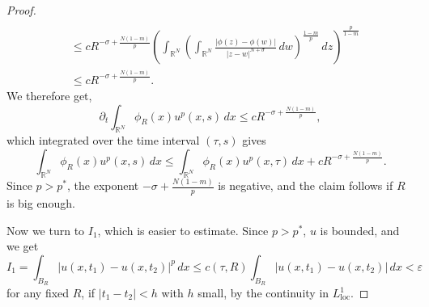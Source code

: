 \documentclass[10pt,a4paper]{amsart}
\begin{document}
\begin{proof}
\begin{align*}
 \\&
\le  cR^{-\sigma+\frac{N(1-m)}{p}}\left(\int_{\mathbb{R}^N}\left( \int_{\mathbb{R}^N}\frac{|\phi(z)-\phi(w)|}{|z-w|^{N+\sigma}}\,dw\right)^{\frac{1-m}{p}}\,dz\right)^{\frac p{1-m}}
 \\&
\le  cR^{-\sigma+\frac{N(1-m)}{p}}.
\end{align*}
We therefore get,
$$
\partial_t\int_{\mathbb{R}^N}\phi_R(x)u^p(x,s)\,dx\le cR^{-\sigma+\frac{N(1-m)}{p}},
$$
which integrated over the time interval $(\tau,s)$  gives
$$
\int_{\mathbb{R}^N}\phi_R(x)u^p(x,s)\,dx\le \int_{\mathbb{R}^N}\phi_R(x)u^p(x,\tau)\,dx+cR^{-\sigma+\frac{N(1-m)}{p}}. 
$$
Since $p>p^*$, the exponent $-\sigma+\frac{N(1-m)}{p}$ is negative, and the claim follows if $R$ is big enough. 

Now we turn to $I_1$, which is easier to estimate. Since $p>p^*$, $u$ is bounded, and we get
$$
    I_1=\int_{B_R}|u(x,t_1)-u(x,t_2)|^p\,dx \le c(\tau,R)\int_{B_R}|u(x,t_1)-u(x,t_2)|\,dx<\varepsilon
$$
for any fixed $R$, if $|t_1-t_2|<h$ with $h$ small,  by the continuity in $L^1_{\text{loc}}$. 
\end{proof}
\end{document}
